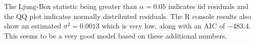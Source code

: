 The Ljung-Box statistic being greater than $\alpha = 0.05$ indicates iid residuals and the QQ plot indicates normally distributed residuals. The R console results also show an estimated $\sigma^2 = 0.0013$ which is very low, along with an AIC of $-483.4$. This seems to be a very good model based on these additional numbers.